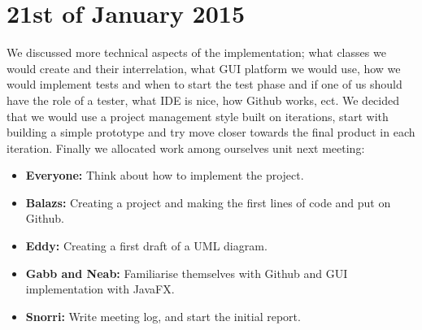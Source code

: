 \documentclass[11pt]{article}
\begin{document}
\section{21st of January 2015}
We discussed more technical aspects of the implementation; what classes we would create and their interrelation, what GUI platform we would use, how we would implement tests and when to start the test phase and if one of us should have the role of a tester, what IDE is nice, how Github works, ect. We decided that we would use a project management style built on iterations, start with building a simple prototype and try move closer towards the final product in each iteration. Finally we allocated work among ourselves unit next meeting:
\begin{itemize}
\item \textbf{Everyone:} Think about how to implement the project.

\item \textbf{Balazs:} Creating a project and making the first lines of code and put on Github.

\item \textbf{Eddy:} Creating a first draft of a UML diagram.

\item \textbf{Gabb and Neab:} Familiarise themselves with Github and GUI implementation with JavaFX.

\item \textbf{Snorri:} Write meeting log, and start the initial report.

\end{itemize} 

\newpage
\end{document}
